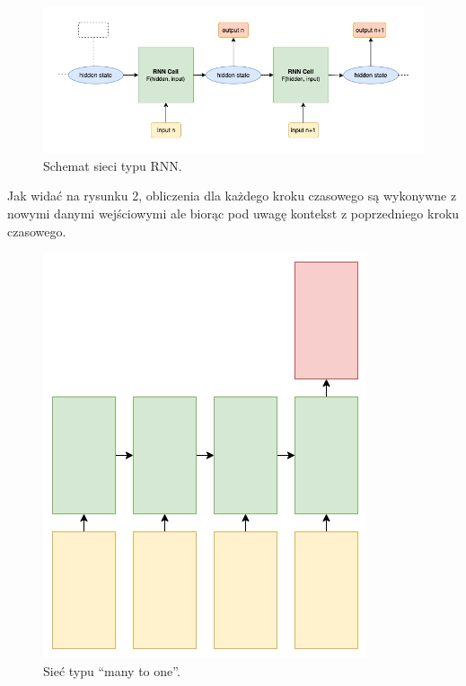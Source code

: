\begin{figure}[!ht]
\includegraphics[width=\linewidth]{./images/rnn.png}
\caption{Schemat sieci typu RNN.}
\label{fig:test3}
\end{figure}
Jak widać na rysunku 2, obliczenia dla każdego kroku czasowego są wykonywne z nowymi danymi wejściowymi
ale biorąc pod uwagę kontekst z poprzedniego kroku czasowego. 
\begin{figure}
\vspace{-4mm}
\includegraphics[width=\linewidth]{./images/many-to-one.png}
\caption{Sieć typu ``many to one''.}
\label{fig:test3}
\vspace{-4mm}
\end{figure}
